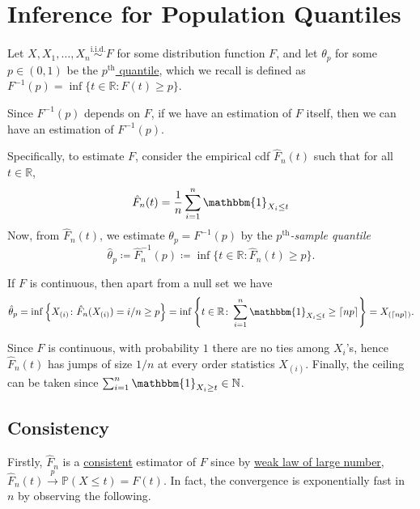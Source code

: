\section{Inference for Population Quantiles}
Let \(X, X_1, \dots , X_n \overset{\text{i.i.d.} }{\sim } F\) for some distribution function \(F\), and let \(\theta _p\) for some \(p \in (0, 1)\) be the \hyperref[def:quantile-function]{\(p^{\text{th} }\) quantile}, which we recall is defined as \(F^{-1} (p) = \inf \{ t \in \mathbb{R} \colon F(t) \geq p \} \).

\begin{intuition}
	Since \(F^{-1} (p)\) depends on \(F\), if we have an estimation of \(F\) itself, then we can have an estimation of \(F^{-1} (p)\).
\end{intuition}

Specifically, to estimate \(F\), consider the empirical cdf \(\hat{F} _n(t)\) such that for all \(t \in \mathbb{R} \),
\[
	\hat{F} _n(t) = \frac{1}{n} \sum_{i=1}^{n} \mathbbm{1}_{X_i \leq t}
\]
Now, from \(\hat{F} _n(t)\), we estimate \(\theta _p = F^{-1} (p)\) by the \emph{\(p^{\text{th} }\)-sample quantile}
\[
	\hat{\theta} _p
	\coloneqq \hat{F} _n ^{-1} (p)
	\coloneqq \inf \{ t \in \mathbb{R} \colon \hat{F} _n(t) \geq p \}.
\]

\begin{remark}
	If \(F\) is continuous, then apart from a null set we have
	\[
		\hat{\theta} _p
		= \inf \left\{ X_{(i)} \colon \hat{F} _n(X_{(i)}) = i / n \geq p \right\}
		= \inf \left\{ t \in \mathbb{R} \colon \sum_{i=1}^{n} \mathbbm{1}_{X_i \leq t} \geq \lceil np \rceil \right\}
		= X_{(\lceil np \rceil )}.
	\]
\end{remark}
\begin{explanation}
	Since \(F\) is continuous, with probability \(1\) there are no ties among \(X_i\)'s, hence \(\hat{F} _n(t)\) has jumps of size \(1 / n\) at every order statistics \(X_{(i)}\). Finally, the ceiling can be taken since \(\sum_{i=1}^{n} \mathbbm{1}_{X_i \geq t} \in \mathbb{N} \).
\end{explanation}

\subsection{Consistency}
Firstly, \(\hat{F} _n\) is a \hyperref[def:consistent]{consistent} estimator of \(F\) since by \hyperref[thm:WLLN]{weak law of large number}, \(\hat{F} _n(t) \overset{p}{\to} \mathbb{P} (X \leq t) = F(t)\). In fact, the convergence is exponentially fast in \(n\) by observing the following.

